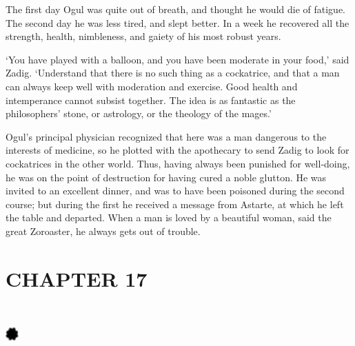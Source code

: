 \documentclass{article}
\begin{document}
\begin{center}
The first day Ogul was quite out of breath, and thought he would die of fatigue. 
The second day he was less tired, and slept better. In a week he recovered all 
the strength, health, nimbleness, and gaiety of his most robust years. 

`You have played with a balloon, and you have been moderate in your food,' said 
Zadig. `Understand that there is no such thing as a cockatrice, and that a man 
can always keep well with moderation and exercise. Good health and intemperance 
cannot subsist together. The idea is as fantastic as the philosophers' stone, or 
astrology, or the theology of the mages.' 

Ogul's principal physician recognized that here was a man dangerous to the interests 
of medicine, so he plotted with the apothecary to send Zadig to look for cockatrices 
in the other world. Thus, having always been punished for well-doing, he was on 
the point of destruction for having cured a noble glutton. He was invited to an 
excellent dinner, and was to have been poisoned during the second course; but during 
the first he received a message from Astarte, at which he left the table and departed. 
When a man is loved by a beautiful woman, said the great Zoroaster, he always gets 
out of trouble.\pagebreak{} 

\section*{\textbf{CHAPTER 17  }}

\section*{%
\includegraphics[width=14pt, height=15pt, keepaspectratio=true]{Zadig or L'Ingenu - Voltaire-fig020.jpg}
}

 


\end{center}
\end{document}
